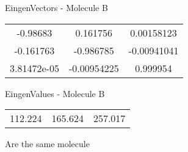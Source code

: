 \begin{multicols}{2}
\begin{center}
\vtab
 EingenVectors - Molecule B     \\
\vtab
\begin{tabular}{|c c c|}
-0.98683	 & 	0.161756	 & 	0.00158123	 \\
-0.161763	 & 	-0.986785	 & 	-0.00941041	 \\
3.81472e-05	 & 	-0.00954225	 & 	0.999954
\end{tabular}

\vtab
 EingenValues - Molecule B     \\
\vtab
\begin{tabular}{|c c c|}
112.224	 & 	165.624	 & 	257.017
\end{tabular}

\end{center}
\end{multicols}
\begin{center}
\vtab
\vtab
\textcolor{NavyBlue}{\Large Are the same molecule}
\end{center}
\newpage

